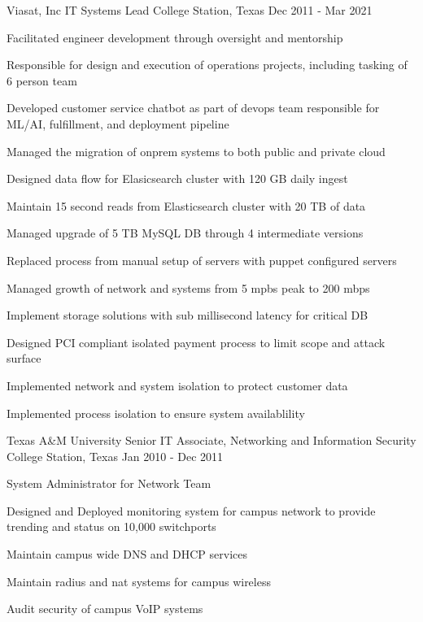 \begin{cventries}
  \cventry
    {Viasat, Inc} %
    {IT Systems Lead} %
    {College Station, Texas} %
    {Dec 2011 - Mar 2021} %
    {
      \begin{cvitems} %
        \item {Facilitated engineer development through oversight and mentorship}
        \item {Responsible for design and execution of operations projects, including tasking of 6 person team}
        \item {Developed customer service chatbot as part of devops team responsible for ML/AI, fulfillment, and deployment pipeline}
        \item {Managed the migration of onprem systems to both public and private cloud}
        \item {Designed data flow for Elasicsearch cluster with 120 GB daily ingest}
        \item {Maintain 15 second reads from Elasticsearch cluster with 20 TB of data}
        \item {Managed upgrade of 5 TB MySQL DB through 4 intermediate versions}
        \item {Replaced process from manual setup of servers with puppet configured servers}
        \item {Managed growth of network and systems from 5 mpbs peak to 200 mbps}
        \item {Implement storage solutions with sub millisecond latency for critical DB}
        \item {Designed PCI compliant isolated payment process to limit scope and attack surface}
        \item {Implemented network and system isolation to protect customer data}
        \item {Implemented process isolation to ensure system availablility}
      \end{cvitems}
    }

  \cventry
    {Texas A\&M University} %
    {Senior IT Associate, Networking and Information Security} %
    {College Station, Texas} %
    {Jan 2010 - Dec 2011} %
    {
      \begin{cvitems} %
        \item {System Administrator for Network Team}
        \item {Designed and Deployed monitoring system for campus network to provide trending and status on 10,000 switchports}
        \item {Maintain campus wide DNS and DHCP services}
        \item {Maintain radius and nat systems for campus wireless}
        \item {Audit security of campus VoIP systems}
      \end{cvitems}
    }

\end{cventries}
